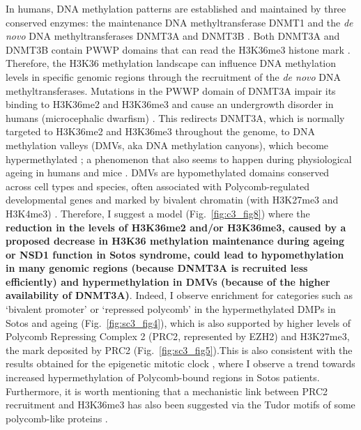 In humans, DNA methylation patterns are established and maintained by three conserved enzymes: the maintenance DNA methyltransferase DNMT1 and the \textit{de novo} DNA methyltransferases DNMT3A and DNMT3B \cite{Schubeler2015}. Both DNMT3A and DNMT3B contain PWWP domains that can read the H3K36me3 histone mark \cite{Dhayalan2010,Baubec2015}. Therefore, the H3K36 methylation landscape can influence DNA methylation levels in specific genomic regions through the recruitment of the \textit{de novo} DNA methyltransferases. Mutations in the PWWP domain of DNMT3A impair its binding to H3K36me2 and H3K36me3 and cause an undergrowth disorder in humans (microcephalic dwarfism) \cite{Heyn2019}. This redirects DNMT3A, which is normally targeted to H3K36me2 and H3K36me3 throughout the genome, to DNA methylation valleys (\acrshort{DMV}s, aka DNA methylation canyons), which become hypermethylated \cite{Heyn2019}; a phenomenon that also seems to happen during physiological ageing in humans \cite{Slieker2016,Rakyan2010,Teschendorff2010} and mice \cite{Cole2017}. DMVs are hypomethylated domains conserved across cell types and species, often associated with Polycomb-regulated developmental genes and marked by bivalent chromatin (with \acrshort{H3K27me3} and \acrshort{H3K4me3}) \cite{Xie2013,Long2013,Jeong2013,Li2018}. Therefore, I suggest a model (Fig.~\ref{fig:c3_fig8}) where the \textbf{reduction in the levels of H3K36me2 and/or H3K36me3, caused by a proposed decrease in H3K36 methylation maintenance during ageing or NSD1 function in Sotos syndrome, could lead to hypomethylation in many genomic regions (because DNMT3A is recruited less efficiently) and hypermethylation in DMVs (because of the higher availability of DNMT3A)}. Indeed, I observe enrichment for categories such as `bivalent promoter' or `repressed polycomb' in the hypermethylated DMPs in Sotos and ageing (Fig.~\ref{fig:sc3_fig4}), which is also supported by higher levels of Polycomb Repressing Complex 2 (\acrshort{PRC2}, represented by EZH2) and H3K27me3, the mark deposited by PRC2 (Fig.~\ref{fig:sc3_fig5}).This is also consistent with the results obtained for the epigenetic mitotic clock \cite{Yang2016}, where I observe a trend towards increased hypermethylation of Polycomb-bound regions in Sotos patients. Furthermore, it is worth mentioning that a mechanistic link between PRC2 recruitment and H3K36me3 has also been suggested via the Tudor motifs of some polycomb-like proteins \cite{Cai2013}.

